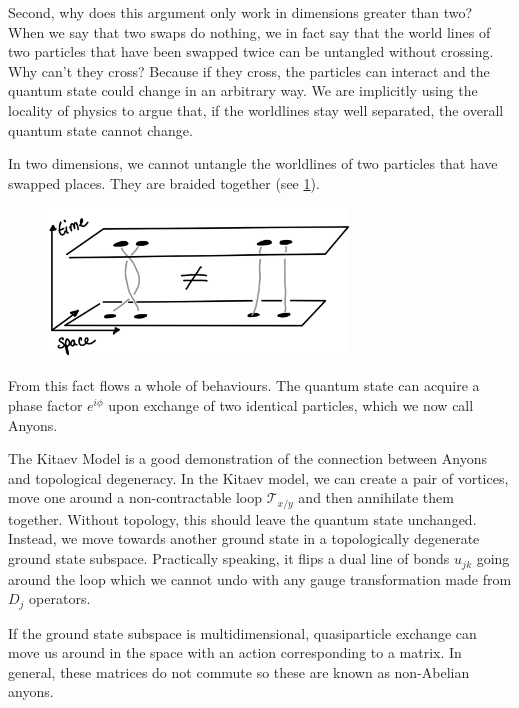 Second, why does this argument only work in dimensions greater than two? When we say that two swaps do nothing, we in fact say that the world lines of two particles that have been swapped twice can be untangled without crossing. Why can't they cross? Because if they cross, the particles can interact and the quantum state could change in an arbitrary way. We are implicitly using the locality of physics to argue that, if the worldlines stay well separated, the overall quantum state cannot change.

In two dimensions, we cannot untangle the worldlines of two particles that have swapped places. They are braided together (see \cref{fig:braiding}).

\begin{figure}
\hypertarget{fig:braiding}{%
\centering
\includegraphics[width=0.71\textwidth,height=\textheight]{figure_code/amk_chapter/braiding.png}
\caption{}\label{fig:braiding}
}
\end{figure}

From this fact flows a whole of behaviours. The quantum state can acquire a phase factor \(e^{i\phi}\) upon exchange of two identical particles, which we now call Anyons.

The Kitaev Model is a good demonstration of the connection between Anyons and topological degeneracy. In the Kitaev model, we can create a pair of vortices, move one around a non-contractable loop \(\mathcal{T}_{x/y}\) and then annihilate them together. Without topology, this should leave the quantum state unchanged. Instead, we move towards another ground state in a topologically degenerate ground state subspace. Practically speaking, it flips a dual line of bonds \(u_{jk}\) going around the loop which we cannot undo with any gauge transformation made from \(D_j\) operators.

If the ground state subspace is multidimensional, quasiparticle exchange can move us around in the space with an action corresponding to a matrix. In general, these matrices do not commute so these are known as non-Abelian anyons.

